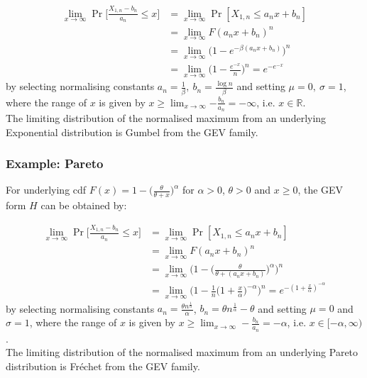 \documentclass[11pt]{article}
\newcommand{\noi}{\noindent}
\begin{document}
\begin{align*}
    \lim_{x\rightarrow\infty}{\Pr\Big[\frac{X_{1,n} - b_n}{a_n} \leq x\Big]} &= \lim_{x\rightarrow\infty}{\Pr[X_{1,n} \leq a_nx + b_n]} \\
    &= \lim_{x\rightarrow\infty}{F(a_n x + b_n)^n} \\
    &= \lim_{x\rightarrow\infty}{\Big( 1 - e^{-\beta(a_n x + b_n)} \Big)^n} \\
    &= \lim_{x\rightarrow\infty}{\Big( 1 - \frac{e^{-x}}{n} \Big)^n} = e^{-e^{-x}}
\end{align*}
\noi by selecting normalising constants $a_n = \frac{1}{\beta}, \: b_n = \frac{\log n}{\beta}$ and setting $\mu = 0, \: \sigma = 1$, where the range of $x$ is given by $x \geq \lim_{x\rightarrow\infty}{-\frac{b_n}{a_n}} = -\infty$, i.e. $x \in \mathbb{R}$. \\

\noi The limiting distribution of the normalised maximum from an underlying Exponential distribution is Gumbel from the GEV family.

\subsubsection{Example: Pareto}
\noi For underlying cdf $F(x) = 1 - \Big( \frac{\theta}{\theta + x} \Big)^\alpha$ for $\alpha > 0$, $\theta > 0$ and $x \geq 0$, the GEV form $H$ can be obtained by:

\begin{align*}
    \lim_{x\rightarrow\infty}{\Pr\Big[\frac{X_{1,n} - b_n}{a_n} \leq x\Big]} &= \lim_{x\rightarrow\infty}{\Pr[X_{1,n} \leq a_nx + b_n]} \\
    &= \lim_{x\rightarrow\infty}{F(a_n x + b_n)^n} \\
    &= \lim_{x\rightarrow\infty}{\Big( 1 - \Big( \frac{\theta}{\theta + (a_n x + b_n)} \Big)^\alpha \Big)^n} \\
    &= \lim_{x\rightarrow\infty}{\Big( 1 - \frac{1}{n}\Big( 1 + \frac{x}{\alpha} \Big)^{-\alpha} \Big)^n} = e^{-(1 + \frac{x}{\alpha})^{-\alpha}}
\end{align*}
\noi by selecting normalising constants $a_n = \frac{\theta n^{\frac{1}{\alpha}}}{\alpha}$, $b_n = \theta n^{\frac{1}{\alpha}} - \theta$ and setting $\mu=0$ and $\sigma=1$, where the range of $x$ is given by $x \geq \lim_{x\rightarrow\infty} - \frac{b_n}{a_n} = -\alpha$, i.e. $x \in [-\alpha, \infty)$. \\

\noi The limiting distribution of the normalised maximum from an underlying Pareto distribution is Fr\'echet from the GEV family. \\
\end{document}
